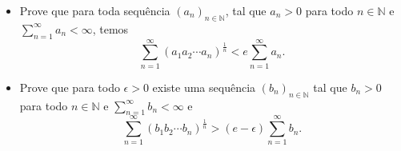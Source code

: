 \begin{itemize}
\item[(a)] Prove que para toda sequência \((a_{n})_{n\in \mathbb{N}}\), tal que \(a_{n}>0\) para todo \(n \in \mathbb{N}\) e
\(\sum_{n=1}^{\infty}a_{n}<\infty\), temos
\[\sum_{n=1}^{\infty}(a_{1}a_{2} \cdots a_{n})^{\frac{1}{n}}< e\sum_{n=1}^{\infty}a_{n}.\]
\item[(b)] Prove que para todo \(\epsilon>0\) existe uma sequência \((b_{n})_{n\in \mathbb{N}}\) tal que \(b_{n}>0\) para todo \(n \in \mathbb{N}\) e
\(\sum_{n=1}^{\infty}b_{n}<\infty\) e
\[\sum_{n=1}^{\infty}(b_{1}b_{2} \cdots b_{n})^{\frac{1}{n}}> (e-\epsilon)\sum_{n=1}^{\infty}b_{n}.\]
\end{itemize}
